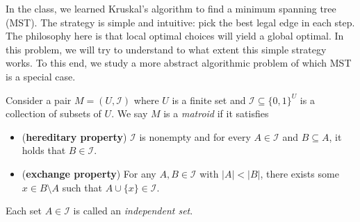 \documentclass{oxmathproblems}
\begin{document}
\begin{questions}
\miquestion[35]
In the class, we learned Kruskal's algorithm to find a minimum spanning tree (MST). The strategy is simple and intuitive: pick the best legal edge in each step. The philosophy here is that local optimal choices will yield a global optimal. In this problem, we will try to understand to what extent this simple strategy works. To this end, we study a more abstract algorithmic problem of which MST is a special case.

Consider a pair $M=(U,\mathcal{I})$ where $U$ is a finite set and $\mathcal{I}\subseteq \{0,1\}^U$ is a collection of subsets of $U$. We say $M$ is a \emph{matroid} if it satisfies
\begin{itemize}
    \item (\textbf{hereditary property}) $\mathcal{I}$ is nonempty and for every $A\in\mathcal{I}$ and $B\subseteq A$, it holds that $B\in\mathcal{I}$.
    \item (\textbf{exchange property}) For any $A,B\in\mathcal{I}$ with $|A|<|B|$, there exists some $x\in B\setminus A$ such that $A\cup\{x\}\in\mathcal{I}$.
\end{itemize}
Each set $A\in\mathcal{I}$ is called an \emph{independent set}.

\end{questions}
\end{document}
